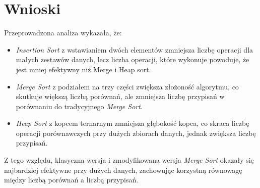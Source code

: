 \documentclass[a4paper,12pt]{article}
\begin{document}
\newpage
\section{Wnioski}
Przeprowadzona analiza wykazała, że:
\begin{itemize}
    \item \textit{Insertion Sort} z wstawianiem dwóch elementów zmniejsza liczbę operacji dla małych zestawów danych, lecz liczba operacji, które wykonuje powoduje, że jest mniej efektywny niż Merge i Heap sort.
    \item \textit{Merge Sort} z podziałem na trzy części zwiększa złożoność algorytmu, co skutkuje większą liczbą porównań, ale zmniejsza liczbę przypisań w porównaniu do tradycyjnego \textit{Merge Sort}.
    \item \textit{Heap Sort} z kopcem ternarnym zmniejsza głębokość kopca, co skraca liczbę operacji porównawczych przy dużych zbiorach danych, jednak zwiększa liczbę przypisań.
\end{itemize}

Z tego względu, klasyczna wersja i zmodyfikowana wersja \textit{Merge Sort} okazały się najbardziej efektywne przy dużych danych, zachowując korzystną równowagę między liczbą porównań a liczbą przypisań.
\end{document}
